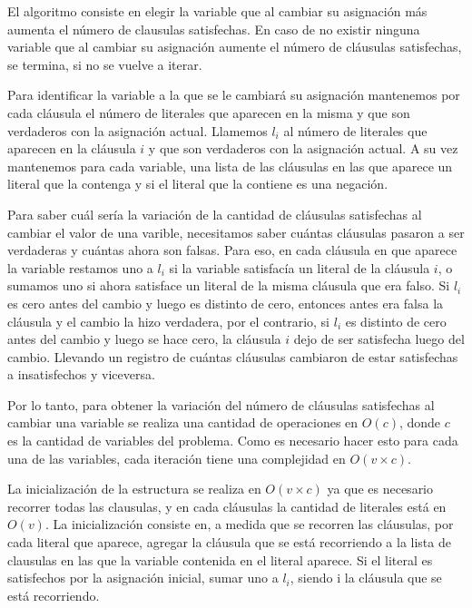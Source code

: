 \documentclass[a4paper,10pt]{article}
\begin{document}
El algoritmo consiste en elegir la variable que al cambiar su asignación más aumenta el número de clausulas satisfechas. En caso de no existir ninguna variable que al cambiar su asignación aumente el número de cláusulas satisfechas, se termina, si no se vuelve a iterar.

Para identificar la variable a la que se le cambiará su asignación mantenemos por cada cláusula el número de literales que aparecen en la misma y que son verdaderos con la asignación actual. Llamemos $l_i$ al número de literales que aparecen en la cláusula $i$ y que son verdaderos con la asignación actual. A su vez mantenemos para cada variable, una lista de las cláusulas en las que aparece un literal que la contenga y si el literal que la contiene es una negación. 

Para saber cuál sería la variación de la cantidad de cláusulas satisfechas al cambiar el valor de una varible, necesitamos saber cuántas cláusulas pasaron a ser verdaderas y cuántas ahora son falsas. Para eso, en cada cláusula en que aparece la variable restamos uno a $l_i$ si la variable satisfacía un literal de la cláusula $i$, o sumamos uno si ahora satisface un literal de la misma cláusula que era falso. Si $l_i$ es cero antes del cambio y luego es distinto de cero, entonces antes era falsa la cláusula y el cambio la hizo verdadera, por el contrario, si $l_i$ es distinto de cero antes del cambio y luego se hace cero, la cláusula $i$ dejo de ser satisfecha luego del cambio. Llevando un registro de cuántas cláusulas cambiaron de estar satisfechas a insatisfechos y viceversa. 


Por lo tanto, para obtener la variación del número de cláusulas satisfechas al cambiar una variable se realiza una cantidad de operaciones en $O\left( c \right)$, donde $c$ es la cantidad de variables del problema. Como es necesario hacer esto para cada una de las variables, cada iteración tiene una complejidad en $O\left( v \times c  \right)$.

La inicialización de la estructura se realiza en $O\left( v \times  c\right)$ ya que es necesario recorrer todas las clausulas, y en cada cláusulas la cantidad de literales está en $O\left( v\right)$. La inicialización consiste en, a medida que se recorren las cláusulas, por cada literal que aparece, agregar la cláusula que se está recorriendo a la lista de clausulas en las que la variable contenida en el literal aparece. Si el literal es satisfechos por la asignación inicial, sumar uno a $l_i$, siendo i la cláusula que se está recorriendo. 
\end{document}
